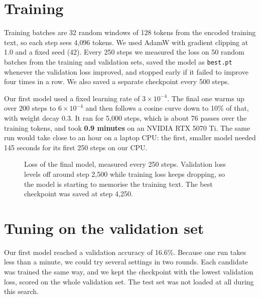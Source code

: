 \documentclass[11pt,a4paper]{article}
\begin{document}
\section{Training}

Training batches are 32 random windows of 128 tokens from the encoded training text, so each step sees 4{,}096 tokens. We used AdamW with gradient clipping at 1.0 and a fixed seed (42). Every 250 steps we measured the loss on 50 random batches from the training and validation sets, saved the model as \texttt{best.pt} whenever the validation loss improved, and stopped early if it failed to improve four times in a row. We also saved a separate checkpoint every 500 steps.

Our first model used a fixed learning rate of $3\times10^{-4}$. The final one warms up over 200 steps to $6\times10^{-4}$ and then follows a cosine curve down to 10\% of that, with weight decay 0.3. It ran for 5{,}000 steps, which is about 76 passes over the training tokens, and took \textbf{0.9 minutes} on an NVIDIA RTX 5070 Ti. The same run would take close to an hour on a laptop CPU: the first, smaller model needed 145 seconds for its first 250 steps on our CPU.

\begin{figure}[H]
\centering
{}
\caption{Loss of the final model, measured every 250 steps. Validation loss levels off around step 2{,}500 while training loss keeps dropping, so the model is starting to memorise the training text. The best checkpoint was saved at step 4{,}250.}
\end{figure}

\section{Tuning on the validation set}
\label{sec:tuning}

Our first model reached a validation accuracy of 16.6\%. Because one run takes less than a minute, we could try several settings in two rounds. Each candidate was trained the same way, and we kept the checkpoint with the lowest validation loss, scored on the whole validation set. The test set was not loaded at all during this search.
\end{document}
